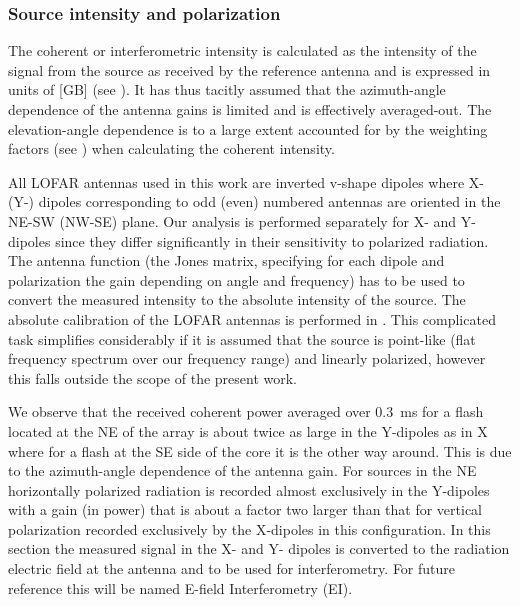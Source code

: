 \subsubsection{Source intensity and polarization}

The coherent or interferometric intensity is calculated as the intensity of the signal from the source as received by the reference antenna and is expressed in units of [GB] (see ). It has thus tacitly assumed that the azimuth-angle dependence of the antenna gains is limited and is effectively averaged-out. The elevation-angle dependence is to a large extent accounted for by the weighting factors (see ) when calculating the coherent intensity.

All LOFAR antennas used in this work are inverted v-shape dipoles where X- (Y-) dipoles corresponding to odd (even) numbered antennas are oriented in the NE-SW (NW-SE) plane. Our analysis is performed separately for X- and Y-dipoles since they differ significantly in their sensitivity to polarized radiation. The antenna function (the Jones matrix, specifying for each dipole and polarization the gain depending on angle and frequency) has to be used \cite{Haarlem:2013} to convert the measured intensity to the absolute intensity of the source. The absolute calibration of the LOFAR antennas is performed in \cite{Mulrey:2019}.
This complicated task simplifies considerably if it is assumed that the source is point-like (flat frequency spectrum over our frequency range) and linearly polarized, however this falls outside the scope of the present work.



We observe that the received coherent power averaged over 0.3~ms for a flash located at the NE of the array is about twice as large in the Y-dipoles as in X where for a flash at the SE side of the core it is the other way around. This is due to the azimuth-angle dependence of the antenna gain. For sources in the NE horizontally polarized radiation is recorded almost exclusively in the Y-dipoles with a gain (in power) that is about a factor two larger than that for vertical polarization recorded exclusively by the X-dipoles in this configuration.
In this section the measured signal in the X- and Y- dipoles is converted to the radiation electric field at the antenna and to be used for interferometry. For future reference this will be named E-field Interferometry (EI).

